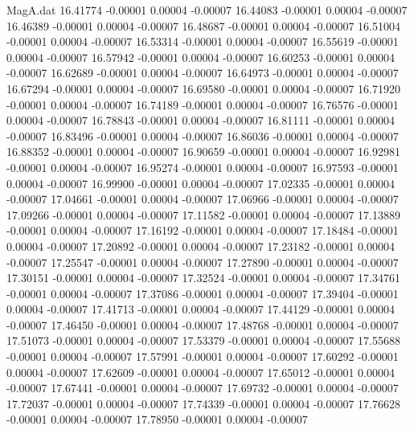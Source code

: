 \begin{filecontents}{MagA.dat}
  16.41774   -0.00001    0.00004   -0.00007
  16.44083   -0.00001    0.00004   -0.00007
  16.46389   -0.00001    0.00004   -0.00007
  16.48687   -0.00001    0.00004   -0.00007
  16.51004   -0.00001    0.00004   -0.00007
  16.53314   -0.00001    0.00004   -0.00007
  16.55619   -0.00001    0.00004   -0.00007
  16.57942   -0.00001    0.00004   -0.00007
  16.60253   -0.00001    0.00004   -0.00007
  16.62689   -0.00001    0.00004   -0.00007
  16.64973   -0.00001    0.00004   -0.00007
  16.67294   -0.00001    0.00004   -0.00007
  16.69580   -0.00001    0.00004   -0.00007
  16.71920   -0.00001    0.00004   -0.00007
  16.74189   -0.00001    0.00004   -0.00007
  16.76576   -0.00001    0.00004   -0.00007
  16.78843   -0.00001    0.00004   -0.00007
  16.81111   -0.00001    0.00004   -0.00007
  16.83496   -0.00001    0.00004   -0.00007
  16.86036   -0.00001    0.00004   -0.00007
  16.88352   -0.00001    0.00004   -0.00007
  16.90659   -0.00001    0.00004   -0.00007
  16.92981   -0.00001    0.00004   -0.00007
  16.95274   -0.00001    0.00004   -0.00007
  16.97593   -0.00001    0.00004   -0.00007
  16.99900   -0.00001    0.00004   -0.00007
  17.02335   -0.00001    0.00004   -0.00007
  17.04661   -0.00001    0.00004   -0.00007
  17.06966   -0.00001    0.00004   -0.00007
  17.09266   -0.00001    0.00004   -0.00007
  17.11582   -0.00001    0.00004   -0.00007
  17.13889   -0.00001    0.00004   -0.00007
  17.16192   -0.00001    0.00004   -0.00007
  17.18484   -0.00001    0.00004   -0.00007
  17.20892   -0.00001    0.00004   -0.00007
  17.23182   -0.00001    0.00004   -0.00007
  17.25547   -0.00001    0.00004   -0.00007
  17.27890   -0.00001    0.00004   -0.00007
  17.30151   -0.00001    0.00004   -0.00007
  17.32524   -0.00001    0.00004   -0.00007
  17.34761   -0.00001    0.00004   -0.00007
  17.37086   -0.00001    0.00004   -0.00007
  17.39404   -0.00001    0.00004   -0.00007
  17.41713   -0.00001    0.00004   -0.00007
  17.44129   -0.00001    0.00004   -0.00007
  17.46450   -0.00001    0.00004   -0.00007
  17.48768   -0.00001    0.00004   -0.00007
  17.51073   -0.00001    0.00004   -0.00007
  17.53379   -0.00001    0.00004   -0.00007
  17.55688   -0.00001    0.00004   -0.00007
  17.57991   -0.00001    0.00004   -0.00007
  17.60292   -0.00001    0.00004   -0.00007
  17.62609   -0.00001    0.00004   -0.00007
  17.65012   -0.00001    0.00004   -0.00007
  17.67441   -0.00001    0.00004   -0.00007
  17.69732   -0.00001    0.00004   -0.00007
  17.72037   -0.00001    0.00004   -0.00007
  17.74339   -0.00001    0.00004   -0.00007
  17.76628   -0.00001    0.00004   -0.00007
  17.78950   -0.00001    0.00004   -0.00007

\end{filecontents}
